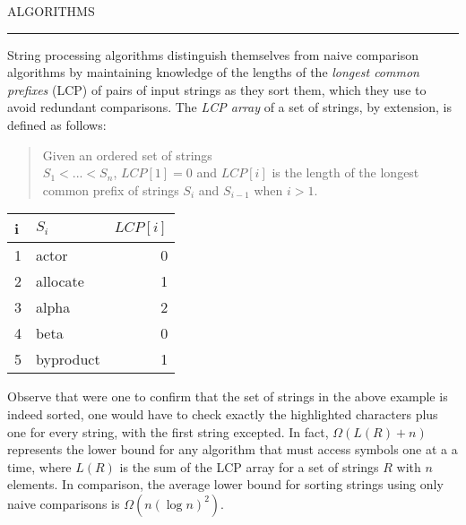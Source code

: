 
\sffamily\normalsize{\color{sciorange}ALGORITHMS}\small\\
\rule[3mm]{190mm}{0.1pt}\vspace{-8mm}
\begin{multicols}{3}
\footnotesize
String processing algorithms distinguish themselves from naive comparison
algorithms by maintaining knowledge of the lengths of the {\em longest common
prefixes} (LCP) of pairs of input strings as they sort them, which they use to
avoid redundant comparisons.  The {\em LCP array} of a set of strings, by
extension, is defined as follows:

\begin{quote}
    Given an ordered set of strings\\ $S_1 < ... < S_n$,
    $LCP[1] = 0$ and $LCP[i]$ is the length of the longest common prefix of
    strings $S_i$ and $S_{i-1}$ when $i > 1$.
\end{quote}

\begin{center}
\begin{tabular}{llr}
    i&  $S_i$&          $LCP[i]$\\ \hline
    1&  actor&        0\\
    2&  {\color{red}a}llocate&   1\\
    3&  {\color{red}al}pha&      2\\
    4&  beta&         0\\
    5&  {\color{red}b}yproduct&  1\\
\end{tabular}
\end{center}

Observe that were one to confirm that the set of strings in the above example
is indeed sorted, one would have to check exactly the highlighted characters
plus one for every string, with the first string excepted.
In fact, $\Omega(L(R) + n)$ represents the lower bound for any algorithm that must
access symbols one at a a time, where $L(R)$ is the sum of the LCP array for
a set of strings $R$ with $n$ elements.  In comparison, the
average lower bound for sorting strings using only naive comparisons is
$\Omega(n(\log n)^2)$.
\end{multicols}%

